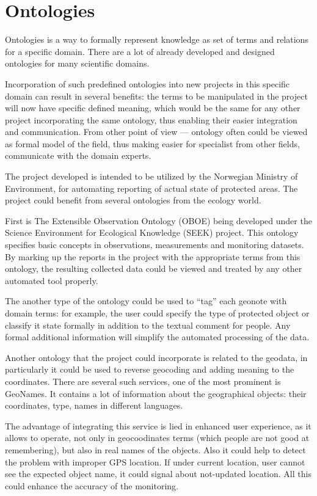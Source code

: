 \documentclass[12pt,a4paper]{article}
\begin{document}
\section{Ontologies}
Ontologies is a way to formally represent knowledge as set of terms
and relations for a specific domain. There are a lot of already
developed and designed ontologies for many scientific domains.

Incorporation of such predefined ontologies into new projects in this specific
domain can result in several benefits: the terms to be manipulated in the
project will now have specific defined meaning, which would be the same for any
other project incorporating the same ontology, thus enabling their easier
integration and communication. From other point of view --- ontology often could
be viewed as formal model of the field, thus making easier for specialist from
other fields, communicate with the domain experts.

The project developed is intended to be utilized by the Norwegian
Ministry of Environment, for automating reporting of actual state of
protected areas. The project could benefit from several ontologies
from the ecology world.

First is The Extensible Observation Ontology (OBOE) being developed
under the Science Environment for Ecological Knowledge (SEEK) project.
This ontology specifies basic concepts in observations, measurements
and monitoring datasets. By marking up the reports in the project with
the appropriate terms from this ontology, the resulting collected data
could be viewed and treated by any other automated tool properly.

The another type of the ontology could be used to ``tag'' each geonote with
domain terms: for example, the user could specify the type of protected object
or classify it state formally in addition to the textual comment for people.
Any formal additional information will simplify the automated processing of
the data.

Another ontology that the project could incorporate is related to the geodata,
in particularly it could be used to reverse geocoding and adding meaning to
the coordinates. There are several such services, one of the most prominent is
GeoNames. It contains a lot of information about the geographical objects:
their coordinates, type, names in different languages.

The advantage of integrating this service is lied in enhanced user experience,
as it allows to operate, not only in geocoodinates terms (which people are not
good at remembering), but also in real names of the objects. Also it could help
to detect the problem with improper GPS location. If under current location,
user cannot see the expected object name, it could signal about not-updated
location. All this could enhance the accuracy of the monitoring.
\end{document}
